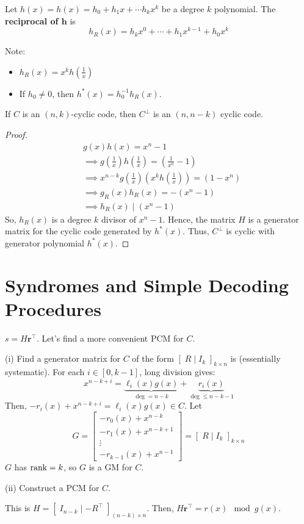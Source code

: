 \begin{defbox}
    \begin{definition}
        Let $ h(x)=h(x)=h_{0}+h_{1} x+\cdots h_k x^{k} $ be a degree $ k $
        polynomial. The \textbf{reciprocal of $\bm{h}$} is
        \[ h_{R}(x)=h_kx^{0}+\cdots+h_{1}x^{k-1}+h_{0}x^{k} \]
    \end{definition}
\end{defbox}
Note:
\begin{itemize}
    \item $ h_R(x)=x^k h\left( \frac{1}{x} \right) $
    \item If $ h_0\neq 0 $, then $ h^*(x)=h_{0}^{-1}h_R(x) $.
\end{itemize}

\begin{thmbox}
    \begin{theorem}
        If $ C $ is an $ (n,k) $-cyclic code, then $ C^{\perp} $ is an
        $ (n,n-k) $ cyclic code.
    \end{theorem}
\end{thmbox}

\begin{proof}
    \begin{align*}
        &g(x)h(x)=x^n-1\\
        &\implies g\left( \frac{1}{x} \right)h\left( \frac{1}{x}  \right)= \left( \frac{1}{x^n}-1 \right)\\
        &\implies x^{n-k}g\left( \frac{1}{x}  \right)\left( x^k h\left( \frac{1}{x} \right) \right)=
        (1-x^n)\\
        &\implies g_R(x)h_R(x)=-(x^n-1)\\
        &\implies h_R(x)\mid (x^n-1)
    \end{align*}
    So, $ h_R(x) $ is a degree $ k $ divisor of $ x^n-1 $. Hence, the matrix
    $ H $ is a generator matrix for the cyclic code generated by $ h^*(x) $.
    Thus, $ C^{\perp} $ is cyclic with generator polynomial $ h^*(x) $.
\end{proof}

\section{Syndromes and Simple Decoding Procedures}
$ s=H\bm{r}^\top $. Let's find a more convenient PCM for $ C $.

(i) Find a generator matrix for $ C $ of the form
$\left[ \; R\mid I_k\; \right]_{k\times n}$ is (essentially systematic).
For each $ i\in [0,k-1] $, long division gives:
\[ x^{n-k+i}=
\underbrace{\ell_i(x)g(x)}_{\deg=n-k}+\underbrace{r_i(x)}_{\deg\leqslant n-k-1} \]
Then, $ -r_i(x)+x^{n-k+i}=\ell_i(x)g(x)\in C $.
Let
\[ G=
\begin{bmatrix}
    -r_0(x)+x^{n-k}\\
    -r_1(x)+x^{n-k+1}\\
    \vdots\\
    -r_{k-1}(x)+x^{n-1}
\end{bmatrix}=\left[ \; R\mid I_k\; \right]_{k\times n}\]
$ G $ has $ \operatorname{rank}=k $, so $ G $ is a GM for $ C $.

(ii) Construct a PCM for $ C $.

This is $ H=\left[ \; I_{n-k}\mid -R^{\top}\; \right]_{(n-k)\times n} $.
Then, $ H\bm{r}^\top=r(x)\mod g(x) $.

